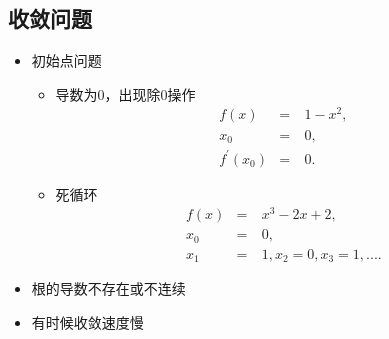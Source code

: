 \documentclass[letterpaper,10pt,english]{sphinxmanual}
\begin{document}
\subsection{收敛问题}
\label{\detokenize{machineLearning/05_newton:id4}}\begin{itemize}
\item {} 
初始点问题
\begin{itemize}
\item {} 
导数为0，出现除0操作
\begin{equation*}
\begin{split}f(x) & = &\  1 - x^2,\\
x_0 & = &\  0, \\
f^{\prime}(x_0) & = &\ 0.\end{split}
\end{equation*}
\item {} 
死循环
\begin{equation*}
\begin{split}f(x) & = &\  x^3 - 2x + 2,\\
x_0 & = &\  0, \\
x_1 & = &\  1, x_2 = 0, x_3 = 1, ... .\end{split}
\end{equation*}
\end{itemize}

\item {} 
根的导数不存在或不连续

\item {} 
有时候收敛速度慢

\end{itemize}
\end{document}
